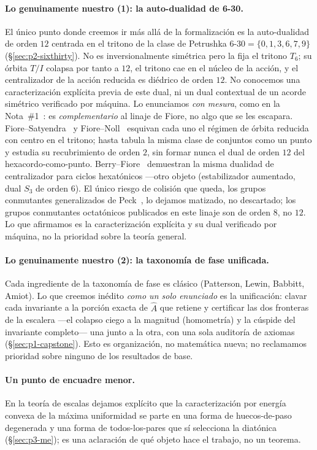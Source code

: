 \documentclass[11pt]{article}
\newcommand{\Ahat}{\hat{A}}
\begin{document}
\paragraph{Lo genuinamente nuestro (1): la auto-dualidad de 6-30.} El único punto donde creemos ir más
allá de la formalización es la auto-dualidad de orden $12$ centrada en el tritono de la clase de Petrushka
$6$-$30=\{0,1,3,6,7,9\}$ (\S\ref{sec:p2-sixthirty}). No es inversionalmente simétrica pero la fija el
tritono $T_6$; su órbita $T/I$ colapsa por tanto a $12$, el tritono cae en el núcleo de la acción, y el
centralizador de la acción reducida es diédrico de orden $12$. No conocemos una caracterización explícita
previa de este dual, ni un dual contextual de un acorde simétrico verificado por máquina. Lo enunciamos
\emph{con mesura}, como en la Nota~\#1~\cite{Note1}: es \emph{complementario} al linaje de Fiore, no algo que se les escapara.
Fiore--Satyendra~\cite{FS} y Fiore--Noll~\cite{FN11,FN25} esquivan cada uno el régimen de órbita reducida
con centro en el tritono; \cite{FN11} hasta tabula la misma clase de conjuntos como un punto y estudia su
recubrimiento de orden $2$, sin formar nunca el dual de orden $12$ del hexacordo-como-punto.
Berry--Fiore~\cite{BF} demuestran la misma dualidad de centralizador para ciclos hexatónicos ---otro
objeto (estabilizador aumentado, dual $S_3$ de orden $6$). El único riesgo de colisión que queda, los
grupos conmutantes generalizados de Peck~\cite{Peck}, lo dejamos matizado, no descartado; los grupos
conmutantes octatónicos publicados en este linaje son de orden $8$, no $12$. Lo que afirmamos es la
caracterización explícita y su dual verificado por máquina, no la prioridad sobre la teoría general.

\paragraph{Lo genuinamente nuestro (2): la taxonomía de fase unificada.} Cada ingrediente de la taxonomía
de fase es clásico (Patterson, Lewin, Babbitt, Amiot). Lo que creemos inédito \emph{como un solo
enunciado} es la unificación: clavar cada invariante a la porción exacta de $\Ahat$ que retiene y
certificar las dos fronteras de la escalera ---el colapso ciego a la magnitud (homometría) y la cúspide del
invariante completo--- una junto a la otra, con una sola auditoría de axiomas (\S\ref{sec:p1-capstone}).
Esto es organización, no matemática nueva; no reclamamos prioridad sobre ninguno de los resultados de base.

\paragraph{Un punto de encuadre menor.} En la teoría de escalas dejamos explícito que la caracterización
por energía convexa de la máxima uniformidad se parte en una forma de huecos-de-paso degenerada y una forma
de todos-los-pares que sí selecciona la diatónica (\S\ref{sec:p3-me}); es una aclaración de qué objeto
hace el trabajo, no un teorema.
\end{document}
